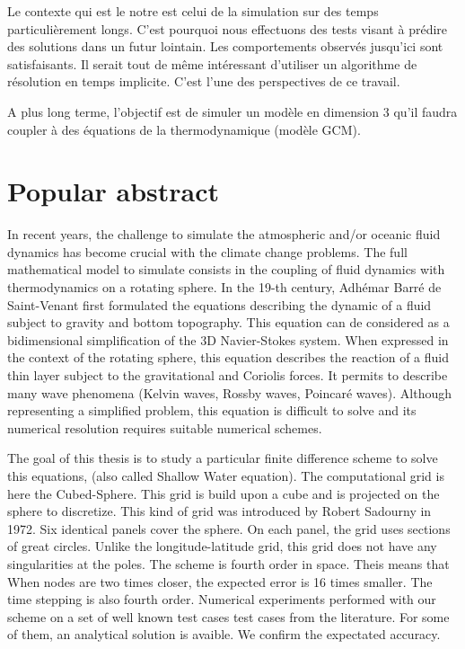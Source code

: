 \documentclass[10pt,a4paper]{article}
\begin{document}
Le contexte qui est le notre est celui de la simulation sur des temps particulièrement longs. C'est pourquoi nous effectuons des tests visant à prédire des solutions dans un futur lointain. Les comportements observés jusqu'ici sont satisfaisants. Il serait tout de même intéressant d'utiliser un algorithme de résolution en temps implicite. C'est l'une des perspectives de ce travail.

A plus long terme, l'objectif est de simuler un modèle en dimension 3 qu'il faudra coupler à des équations de la thermodynamique (modèle GCM).


\section{Popular abstract}

In recent years, the challenge to simulate the atmospheric and/or oceanic 
fluid dynamics has become crucial with the climate change problems. 
The full
mathematical model to simulate consists in the coupling of 
fluid dynamics with  thermodynamics
on a rotating sphere.
In the 19-th century, Adhémar Barré de Saint-Venant
first formulated the equations describing the dynamic
of a fluid subject to gravity and bottom topography. This equation
can de considered as a bidimensional simplification of the 3D 
Navier-Stokes system. When expressed in the context of the rotating sphere,
this equation describes the reaction of a fluid thin layer subject to
the gravitational and Coriolis forces. It permits to describe many wave phenomena (Kelvin
waves, Rossby waves, Poincaré waves). Although representing a simplified
problem, this equation is difficult to solve and its numerical resolution requires suitable
numerical schemes.

The goal of this thesis is to study a particular finite difference scheme
to solve this equations, (also called  Shallow Water equation). 
The computational grid is here the Cubed-Sphere. This grid is build upon a
cube and is projected on the sphere to discretize. This kind of grid was introduced by Robert
Sadourny in 1972. Six identical panels cover the sphere. On each panel, the
grid uses sections of great circles. Unlike the longitude-latitude grid, this grid does not
have any singularities at the poles.
The scheme is fourth order in
space. Theis means that When nodes are two times closer, 
the expected error is 16 times smaller.
The time stepping is also fourth order.
Numerical experiments performed with our scheme on a set of well known test cases test
cases from the literature. For some of them, an analytical solution is avaible. We
confirm the expectated accuracy.
\end{document}
